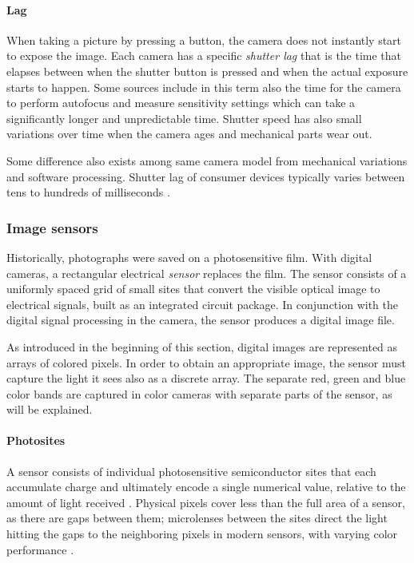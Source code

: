 

\paragraph{Lag}
When taking a picture by pressing a button, the camera does not instantly start to expose the image.
Each camera has a specific \emph{shutter lag} that is the time that elapses between when the shutter button is pressed and when the actual exposure starts to happen.
Some sources include in this term also the time for the camera to perform autofocus and measure sensitivity settings which can take a significantly longer and unpredictable time.
Shutter speed has also small variations over time when the camera ages and mechanical parts wear out.

Some difference also exists among same camera model from mechanical variations and software processing.
Shutter lag of consumer devices typically varies between tens to hundreds of milliseconds \cite{hasshutterlag}.

\subsubsection{Image sensors} \label{sec:sensors} %


Historically, photographs were saved on a photosensitive film.
With digital cameras, a rectangular electrical \emph{sensor} replaces the film.
The sensor consists of a uniformly spaced grid of small sites that convert the visible optical image to electrical signals, built as an integrated circuit package.
In conjunction with the digital signal processing in the camera, the sensor produces a digital image file.


As introduced in the beginning of this section, digital images are represented as arrays of colored pixels.
In order to obtain an appropriate image, the sensor must capture the light it sees also as a discrete array.
The separate red, green and blue color bands are captured in color cameras with separate parts of the sensor, as will be explained.

\paragraph{Photosites}
A sensor consists of individual photosensitive semiconductor sites that each accumulate charge and ultimately encode a single numerical value, relative to the amount of light received \cite[ch.~3]{nakamura2005image}.
Physical pixels cover less than the full area of a sensor, as there are gaps between them;
microlenses between the sites direct the light hitting the gaps to the neighboring pixels in modern sensors, with varying color performance \cite[p.~64]{nakamura2005image} \cite{el2005cmos}.

